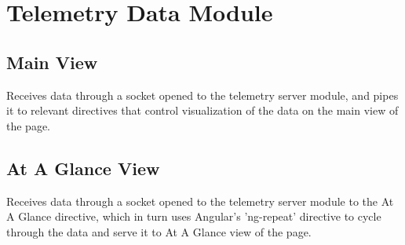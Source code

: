 \section{Telemetry Data Module}

\subsection{Main View}
  Receives data through a socket opened to the telemetry server module, and
  pipes it to relevant directives that control visualization of the data on the
  main view of the page.

\subsection{At A Glance View}
  Receives data through a socket opened to the telemetry server module 
  to the At A Glance directive, which in turn uses Angular's 'ng-repeat' 
  directive to cycle through the data and serve it to At A Glance view of the
  page.

